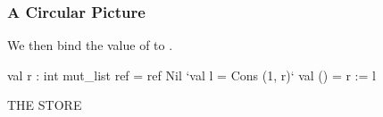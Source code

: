 \documentclass[aspectratio=169, handout]{beamer}
\newcommand{\topthing}[2]{
      \begin{minipage}[t][#1][t]{\textwidth}
        \vspace{\fill}
        #2
        \vspace{\fill}
      \end{minipage}
    }
\begin{document}
\begin{frame}[fragile]
  \frametitle{A Circular Picture}

  \topthing{0.2in}{
    We then bind the value of \code{Cons (1, r)} to \code{l}.
  }

  \vspace{10pt}

  \begin{center}
    \begin{minipage}[t][2.1in][t]{0.55\textwidth}
      \vspace{\fill}
      \small
      \begin{codeblock}
        val r : int mut_list ref = ref Nil
        `val l = Cons (1, r)`
        val () = r := l
      \end{codeblock}
      \vspace{\fill}
    \end{minipage}
    \hfill\vline\hfill
    \begin{minipage}[t][2.1in][t]{0.35\textwidth}
      \centering
      {\hspace{-20pt}\color{gray} \large THE STORE}

      \vspace{\fill}
      \vspace{\fill}
    \end{minipage}
  \end{center}
\end{frame}
\end{document}
